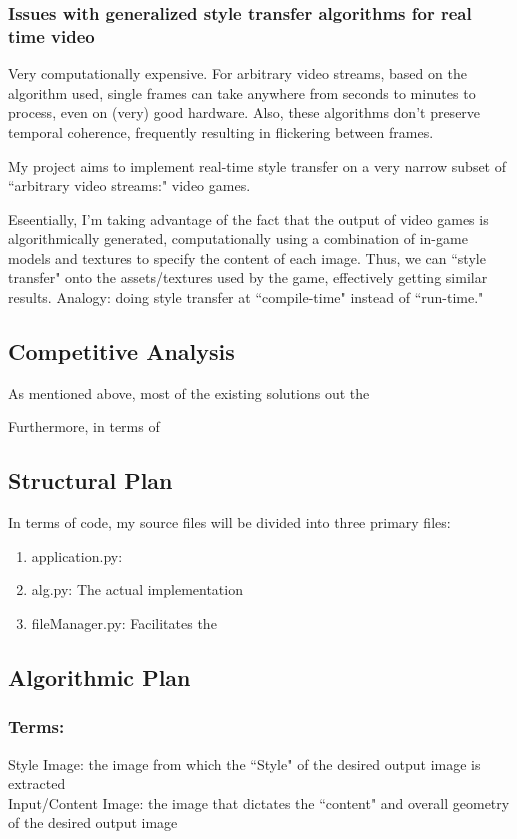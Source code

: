 \documentclass[12pt]{article}
\begin{document}
    \subsubsection{Issues with generalized style transfer algorithms for real time video}
    
    Very computationally expensive. For arbitrary video streams, based on the algorithm used, single frames can take anywhere from seconds to minutes to process, even on (very) good hardware.
    Also, these algorithms don't preserve temporal coherence, frequently resulting in flickering between frames. 

    My project aims to implement real-time style transfer on a very narrow subset of ``arbitrary video streams:" video games.

    Eseentially, I'm taking advantage of the fact that the output of video games is algorithmically generated, computationally using a combination of in-game models and textures to specify the content of each image.
    Thus, we can ``style transfer" onto the assets/textures used by the game, effectively getting similar results. 
    Analogy: doing style transfer at ``compile-time" instead of ``run-time."

\subsection{Competitive Analysis}
    As mentioned above, most of the existing solutions out the 
    
    Furthermore, in terms of 
\subsection{Structural Plan}
    In terms of code, my source files will be divided into three primary files:
    \begin{enumerate}
        \item application.py: 
        \item alg.py: The actual implementation  
        \item fileManager.py: Facilitates the 
    \end{enumerate}
\subsection{Algorithmic Plan}

    \subsubsection{Terms:}
    Style Image: the image from which the ``Style" of the desired output image is extracted\\
    Input/Content Image: the image that dictates the ``content" and overall geometry of the desired output image\\
\end{document}
